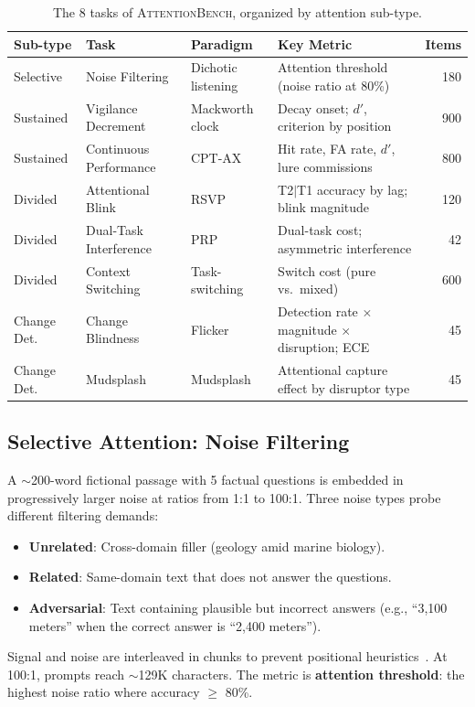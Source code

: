 \documentclass[11pt,twocolumn]{article}
\begin{document}
\begin{table}[t]
\centering
\caption{The 8 tasks of \textsc{AttentionBench}, organized by attention sub-type.}
\label{tab:tasks}
\small
\begin{tabular}{@{}llllr@{}}
\toprule
\textbf{Sub-type} & \textbf{Task} & \textbf{Paradigm} & \textbf{Key Metric} & \textbf{Items} \\
\midrule
Selective   & Noise Filtering         & Dichotic listening    & Attention threshold (noise ratio at 80\%)  & 180 \\
\midrule
Sustained   & Vigilance Decrement & Mackworth clock & Decay onset; $d'$, criterion by position & 900 \\
Sustained   & Continuous Performance   & CPT-AX               & Hit rate, FA rate, $d'$, lure commissions   & 800 \\
\midrule
Divided     & Attentional Blink     & RSVP                 & T2$|$T1 accuracy by lag; blink magnitude   & 120 \\
Divided     & Dual-Task Interference   & PRP                  & Dual-task cost; asymmetric interference     & 42 \\
Divided     & Context Switching        & Task-switching       & Switch cost (pure vs.\ mixed)              & 600 \\
\midrule
Change Det. & Change Blindness   & Flicker              & Detection rate $\times$ magnitude $\times$ disruption; ECE & 45 \\
Change Det. & Mudsplash                & Mudsplash            & Attentional capture effect by disruptor type & 45 \\
\bottomrule
\end{tabular}
\end{table}

\subsection{Selective Attention: Noise Filtering}

A $\sim$200-word fictional passage with 5 factual questions is embedded in progressively larger noise at ratios from 1:1 to 100:1. Three noise types probe different filtering demands:
\begin{itemize}
  \item \textbf{Unrelated}: Cross-domain filler (geology amid marine biology).
  \item \textbf{Related}: Same-domain text that does not answer the questions.
  \item \textbf{Adversarial}: Text containing plausible but incorrect answers (e.g., ``3,100 meters'' when the correct answer is ``2,400 meters'').
\end{itemize}
Signal and noise are interleaved in chunks to prevent positional heuristics~\citep{liu2024lost}. At 100:1, prompts reach $\sim$129K characters. The metric is \textbf{attention threshold}: the highest noise ratio where accuracy $\geq$ 80\%.
\end{document}
